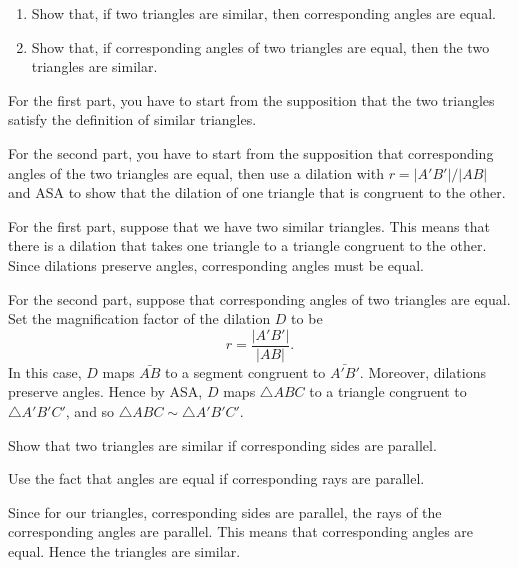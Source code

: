 \documentclass{ximera}
\begin{document}
\begin{question}\hfil
\begin{enumerate}
\item Show that, if two triangles are similar, then corresponding
angles are equal.

\item Show that, if corresponding angles of two triangles are equal, then the two
triangles are similar.
\end{enumerate}

\begin{solution}
\begin{hint}
For the first part, you have to start from the supposition that the
two triangles satisfy the definition of similar triangles.
\end{hint}
\begin{hint}
For the second part, you have to start from the supposition that
corresponding angles of the two triangles are equal, then use a
dilation with $r=|A'B'|/|AB|$ and ASA to show that the dilation of one
triangle that is congruent to the other.
\end{hint}
For the first part, suppose that we have two similar triangles. This
means that there is a dilation that takes one triangle to a triangle
congruent to the other. Since dilations preserve angles,
corresponding angles must be equal.

For the second part, suppose that corresponding angles of two
triangles are equal. Set the magnification factor of the dilation $D$
to be
\[
r = \frac{|A'B'|}{|AB|}.
\]
In this case, $D$ maps $\bar{AB}$ to a segment congruent to
$\bar{A'B'}$. Moreover, dilations preserve angles. Hence by ASA, $D$
maps $\triangle ABC$ to a triangle congruent to $\triangle A'B'C'$,
and so $\triangle ABC \sim \triangle A'B'C'$.
\end{solution}
\end{question}

\begin{question}
\label{39} Show that two triangles are similar if corresponding
sides are parallel.
\begin{solution}
\begin{hint}
Use the fact that angles are equal if corresponding rays are parallel.
\end{hint}
\begin{freeResponse}
Since for our triangles, corresponding sides are parallel, the rays of
the corresponding angles are parallel. This means that corresponding
angles are equal. Hence the triangles are similar.
\end{freeResponse}
\end{solution}
\end{question}
\end{document}
